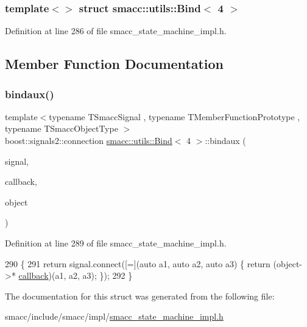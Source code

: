 \subsubsection*{template$<$$>$\newline
struct smacc\+::utils\+::\+Bind$<$ 4 $>$}



Definition at line 286 of file smacc\+\_\+state\+\_\+machine\+\_\+impl.\+h.



\subsection{Member Function Documentation}
\mbox{\label{structsmacc_1_1utils_1_1Bind_3_014_01_4_af999b2ea156fad369be761be47f83f18}} 
\subsubsection{\texorpdfstring{bindaux()}{bindaux()}}
{\footnotesize\ttfamily template$<$typename T\+Smacc\+Signal , typename T\+Member\+Function\+Prototype , typename T\+Smacc\+Object\+Type $>$ \\
boost\+::signals2\+::connection \hyperlink{structsmacc_1_1utils_1_1Bind}{smacc\+::utils\+::\+Bind}$<$ 4 $>$\+::bindaux (\begin{DoxyParamCaption}\item[{T\+Smacc\+Signal \&}]{signal,  }\item[{T\+Member\+Function\+Prototype}]{callback,  }\item[{T\+Smacc\+Object\+Type $\ast$}]{object }\end{DoxyParamCaption})\hspace{0.3cm}{\ttfamily [inline]}}



Definition at line 289 of file smacc\+\_\+state\+\_\+machine\+\_\+impl.\+h.


\begin{DoxyCode}
290       \{
291         \textcolor{keywordflow}{return} signal.connect([=](\textcolor{keyword}{auto} a1, \textcolor{keyword}{auto} a2, \textcolor{keyword}{auto} a3) \{ \textcolor{keywordflow}{return} (object->*
      \hyperlink{sm__ridgeback__barrel__search__1_2servers_2opencv__perception__node_2opencv__perception__node_8cpp_a050e697bd654facce10ea3f6549669b3}{callback})(a1, a2, a3); \});
292       \}
\end{DoxyCode}


The documentation for this struct was generated from the following file\+:\begin{DoxyCompactItemize}
\item 
smacc/include/smacc/impl/\hyperlink{smacc__state__machine__impl_8h}{smacc\+\_\+state\+\_\+machine\+\_\+impl.\+h}\end{DoxyCompactItemize}
